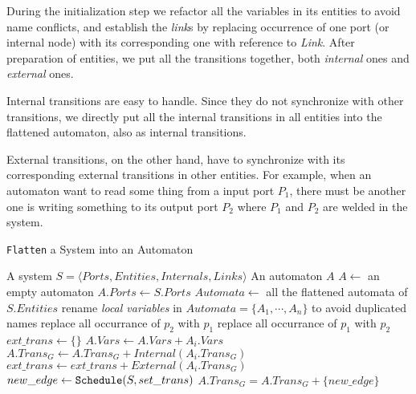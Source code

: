 During the initialization step we refactor all the variables in its entities to avoid name conflicts, and establish the \emph{link}s by replacing occurrence of one port (or internal node) with its corresponding one with reference to \emph{Link}.
After preparation of entities, we put all the transitions together, both \emph{internal} ones and \emph{external} ones.

Internal transitions are easy to handle. Since they do not synchronize with other transitions, we directly put all the internal transitions in all entities into the flattened automaton, also as internal transitions.

External transitions, on the other hand, have to synchronize with its corresponding external transitions in other entities. For example, when an automaton want to read some thing from a input port $P_1$, there must be another one is writing something to its output port $P_2$ where $P_1$ and $P_2$ are welded in the system.

\begin{algorithm}[H]
    \caption{\texttt{Flatten} a System into an Automaton}
    \label{alg:compose}
    \begin{algorithmic}[1]
        \REQUIRE A system $S=\langle Ports, Entities, Internals, Links\rangle$
        \ENSURE An automaton $A$
        \STATE $A \leftarrow $ an empty automaton
        \STATE $A.Ports\leftarrow S.Ports$
        \STATE $Automata\leftarrow$ all the flattened automata of $S.Entities$
        \STATE rename \emph{local variables} in $Automata=\{A_1,\cdots,A_n\}$ to avoid duplicated names
                \STATE replace all occurrance of $p_2$ with $p_1$
            \ELSE
                \STATE replace all occurrance of $p_1$ with $p_2$
            \ENDIF
        \ENDFOR
        \STATE $ext\_trans\leftarrow \{\}$
            \STATE $A.Vars\leftarrow A.Vars + A_i.Vars$
            \STATE $A.Trans_G \leftarrow A.Trans_G + Internal(A_i.Trans_G)$
            \STATE $ext\_trans \leftarrow ext\_trans + External(A_i.Trans_G)$
        \ENDFOR
            \STATE $new\_edge\leftarrow \mbox{\texttt{Schedule}}(S, set\_trans)$ 
                \STATE $A.Trans_G = A.Trans_G + \{new\_edge\}$
            \ENDIF
        \ENDFOR
    \end{algorithmic}
\end{algorithm}

